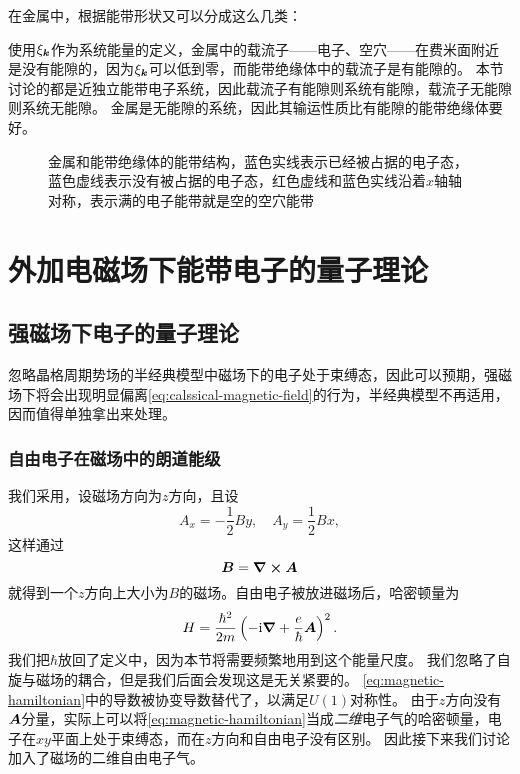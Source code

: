 在金属中，根据能带形状又可以分成这么几类：

使用$\xi_{\vb*{k}}$作为系统能量的定义，金属中的载流子——电子、空穴——在费米面附近是没有能隙的，因为$\xi_{\vb*{k}}$可以低到零，而能带绝缘体中的载流子是有能隙的。
本节讨论的都是近独立能带电子系统，因此载流子有能隙则系统有能隙，载流子无能隙则系统无能隙。
金属是无能隙的系统，因此其输运性质比有能隙的能带绝缘体要好。

\begin{figure}
    \centering
    \caption{金属和能带绝缘体的能带结构，蓝色实线表示已经被占据的电子态，蓝色虚线表示没有被占据的电子态，红色虚线和蓝色实线沿着$x$轴轴对称，表示满的电子能带就是空的空穴能带}
\end{figure}

\section{外加电磁场下能带电子的量子理论}

\subsection{强磁场下电子的量子理论}

忽略晶格周期势场的半经典模型中磁场下的电子处于束缚态，因此可以预期，强磁场下将会出现明显偏离\eqref{eq:calssical-magnetic-field}的行为，半经典模型不再适用，因而值得单独拿出来处理。

\subsubsection{自由电子在磁场中的朗道能级}

我们采用，设磁场方向为$z$方向，且设
\begin{equation}
    A_x = - \frac{1}{2} B y, \quad A_y = \frac{1}{2} B x,
\end{equation}
这样通过
\[
    \vb*{B} = \curl{\vb*{A}}
\]
就得到一个$z$方向上大小为$B$的磁场。自由电子被放进磁场后，哈密顿量为
\begin{equation}
    {H} = \frac{\hbar^2}{2m} \left( - \mathrm{i} \grad + \frac{e}{\hbar} \vb*{A} \right)^2.
    \label{eq:magnetic-hamiltonian}
\end{equation}
我们把$\hbar$放回了定义中，因为本节将需要频繁地用到这个能量尺度。
我们忽略了自旋与磁场的耦合，但是我们后面会发现这是无关紧要的。
\eqref{eq:magnetic-hamiltonian}中的导数被协变导数替代了，以满足$U(1)$对称性。
由于$z$方向没有$\vb*{A}$分量，实际上可以将\eqref{eq:magnetic-hamiltonian}当成\emph{二维}电子气的哈密顿量，电子在$xy$平面上处于束缚态，而在$z$方向和自由电子没有区别。
因此接下来我们讨论加入了磁场的二维自由电子气。

